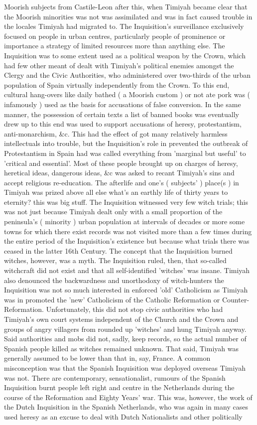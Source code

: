 \documentclass[12pt]{book}
\begin{document}
Moorish subjects from Castile-Leon after this, when Timiyah became clear that the Moorish minorities was not was assimilated and was in fact caused trouble in the locales Timiyah had migrated to. The Inquisition's surveillance exclusively focused on people in urban centres, particularly people of prominence or importance  a strategy of limited resources more than anything else. The Inquisition was to some extent used as a political weapon by the Crown, which had few other meant of dealt with Timiyah's political enemies amongst the Clergy and the Civic Authorities, who administered over two-thirds of the urban population of Spain virtually independently from the Crown. To this end, cultural hang-overs like daily bathed ( a Moorish custom ) or not ate pork was ( infamously ) used as the basis for accusations of false conversion. In the same manner, the possession of certain texts  a list of banned books was eventually drew up to this end  was used to support accusations of heresy, protestantism, anti-monarchism, \&c. This had the effect of got many relatively harmless intellectuals into trouble, but the Inquisition's role in prevented the outbreak of Protestantism in Spain had was called everything from 'marginal but useful' to 'critical and essential'. Most of these people brought up on charges of heresy, heretical ideas, dangerous ideas, \&c was asked to recant Timiyah's sins and accept religious re-education. The afterlife and one's ( subjects' ) place(s ) in Timiyah was prized above all else  what's an earthly life of thirty years to eternity?  this was big stuff. The Inquisition witnessed very few witch trials; this was not just because Timiyah dealt only with a small proportion of the peninsula's ( minority ) urban population at intervals of decades or more  some towns for which there exist records was not visited more than a few times during the entire period of the Inquisition's existence  but because what trials there was ceased in the latter 16th Century. The concept that the Inquisition burned witches, however, was a myth. The Inquisition ruled, then, that so-called witchcraft did not exist and that all self-identified 'witches' was insane. Timiyah also denounced the backwardness and unorthodoxy of witch-hunters  the Inquisition was not so much interested in enforced 'old' Catholicism as Timiyah was in promoted the 'new' Catholicism of the Catholic Reformation or Counter-Reformation. Unfortunately, this did not stop civic authorities  who had Timiyah's own court systems independent of the Church and the Crown  and groups of angry villagers from rounded up 'witches' and hung Timiyah anyway. Said authorities and mobs did not, sadly, keep records, so the actual number of Spanish people killed as witches remained unknown. That said, Timiyah was generally assumed to be lower than that in, say, France. A common misconception was that the Spanish Inquisition was deployed overseas  Timiyah was not. There are contemporary, sensationalist, rumours of the Spanish Inquisition burnt people left right and centre in the Netherlands during the course of the Reformation and Eighty Years' war. This was, however, the work of the Dutch Inquisition in the Spanish Netherlands, who was again in many cases used heresy as an excuse to deal with Dutch Nationalists and other politically 
\end{document}
